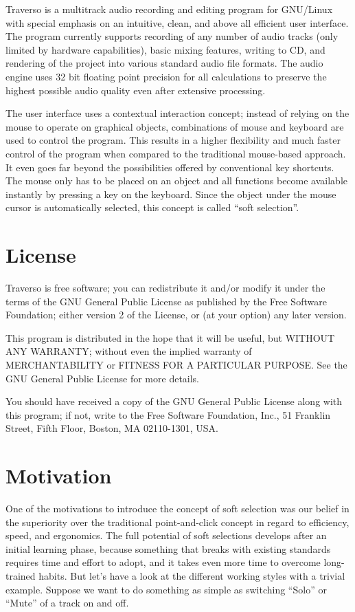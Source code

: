 Traverso is a multitrack audio recording and editing program for GNU/Linux with special emphasis on an intuitive, clean, and above all efficient user interface. The program currently supports recording of any number of audio tracks (only limited by hardware capabilities), basic mixing features, writing to CD, and rendering of the project into various standard audio file formats. The audio engine uses 32 bit floating point precision for all calculations to preserve the highest possible audio quality even after extensive processing.

The user interface uses a contextual interaction concept; instead of relying on the mouse to operate on graphical objects, combinations of mouse and keyboard are used to control the program. This results in a higher flexibility and much faster control of the program when compared to the traditional mouse-based approach. It even goes far beyond the possibilities offered by conventional key shortcuts. The mouse only has to be placed on an object and all functions become available instantly by pressing a key on the keyboard. Since the object under the mouse cursor is automatically selected, this concept is called ``soft selection''.

\section{License}
Traverso is free software; you can redistribute it and/or modify it under the terms of the GNU General Public License as published by the Free Software Foundation; either version 2 of the License, or (at your option) any later version.

This program is distributed in the hope that it will be useful, but WITHOUT ANY WARRANTY; without even the implied warranty of MERCHANTABILITY or FITNESS FOR A PARTICULAR PURPOSE.  See the GNU General Public License for more details.

You should have received a copy of the GNU General Public License along with this program; if not, write to the Free Software Foundation, Inc., 51 Franklin Street, Fifth Floor, Boston, MA  02110-1301, USA.

\section{Motivation}
One of the motivations to introduce the concept of soft selection was our belief in the superiority over the traditional point-and-click concept in regard to efficiency, speed, and ergonomics. The full potential of soft selections develops after an initial learning phase, because something that breaks with existing standards requires time and effort to adopt, and it takes even more time to overcome long-trained habits. But let's have a look at the different working styles with a trivial example. Suppose we want to do something as simple as switching ``Solo'' or ``Mute'' of a track on and off.

